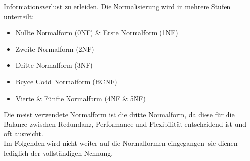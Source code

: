 Informationsverlust zu erleiden. Die Normalisierung wird in mehrere Stufen unterteilt:
\begin{itemize}
    \item Nullte Normalform (0NF) \& Erste Normalform (1NF)
    \item Zweite Normalform (2NF)
    \item Dritte Normalform (3NF)
    \item Boyce Codd Normalform (BCNF)
    \item Vierte \& Fünfte Normalform (4NF \& 5NF)
\end{itemize} 
Die meist verwendete Normalform ist die dritte Normalform, da diese für die Balance zwischen Redundanz, Performance und Flexibilität 
entscheidend ist und oft ausreicht. 
\\ 
Im Folgenden wird nicht weiter auf die Normalformen eingegangen, sie dienen lediglich der vollständigen Nennung.